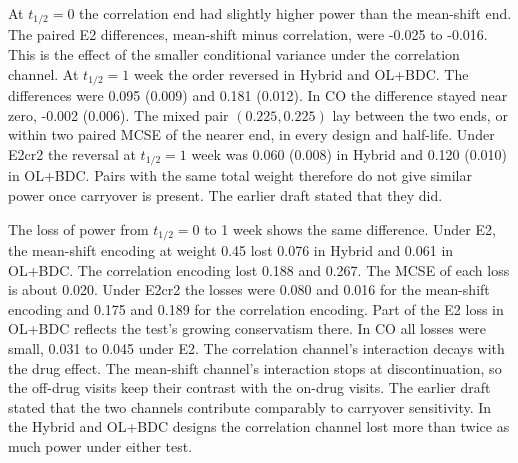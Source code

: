 \documentclass[
  11pt,
]{article}
\begin{document}
At \(t_{1/2} = 0\) the correlation end had slightly higher power than
the mean-shift end. The paired E2 differences, mean-shift minus
correlation, were -0.025 to -0.016. This is the
effect of the smaller conditional variance under the correlation
channel. At \(t_{1/2} = 1\) week the order reversed in Hybrid and
OL+BDC. The differences were 0.095 (0.009) and
0.181 (0.012). In CO the difference stayed near
zero, -0.002 (0.006). The mixed pair
\((0.225, 0.225)\) lay between the two ends, or within two paired MCSE
of the nearer end, in every design and half-life. Under E2cr2 the reversal at \(t_{1/2} = 1\) week was
0.060 (0.008) in Hybrid and
0.120 (0.010) in OL+BDC. Pairs with the
same total weight therefore do not give similar power once carryover
is present. The earlier draft stated that they did.

The loss of power from \(t_{1/2} = 0\) to 1 week shows the same
difference. Under E2, the mean-shift encoding at weight 0.45 lost
0.076 in Hybrid and
0.061 in OL+BDC. The correlation encoding
lost 0.188 and 0.267.
The MCSE of each loss is about 0.020. Under
E2cr2 the losses were 0.080 and
0.016 for the mean-shift encoding and
0.175 and 0.189
for the correlation encoding. Part of the E2 loss in OL+BDC reflects
the test's growing conservatism there. In CO all losses were small,
0.031 to
0.045 under E2. The correlation
channel's interaction decays with the drug effect. The mean-shift
channel's interaction stops at discontinuation, so the off-drug
visits keep their contrast with the on-drug visits. The earlier draft
stated that the two channels contribute comparably to carryover
sensitivity. In the Hybrid and OL+BDC designs the correlation channel
lost more than twice as much power under either test.
\end{document}
